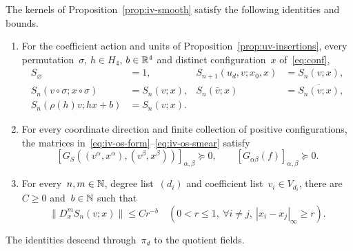 \begin{proposition}\label{prop:iv-euclidean}
The kernels of Proposition~\ref{prop:iv-smooth} satisfy the following identities and bounds.
\begin{enumerate}[label=\textup{(\roman*)},ref=\theproposition(\roman*)]
\item\label{item:iv-symmetries} For the coefficient action and units of Proposition~\ref{prop:uv-insertions}, every permutation~$\sigma$, $h\in H_4$, $b\in\mathbb R^4$ and distinct configuration~$x$ of~\eqref{eq:conf},
\begin{equation}\label{eq:iv-symmetries}
\begin{aligned}
 S_\varnothing&=1,&
 S_{n+1}(u_d,v;x_0,x)&=S_n(v;x),\\
 S_n(v\circ\sigma;x\circ\sigma)&=S_n(v;x),&
 S_n(\bar v;x)&=\overline{S_n(v;x)},\\
 S_n(\rho(h)v;hx+b)&=S_n(v;x).
\end{aligned}
\end{equation}
\item\label{item:iv-reflection} For every coordinate direction and finite collection of positive configurations, the matrices in~\eqref{eq:iv-os-form}--\eqref{eq:iv-os-smear} satisfy
\begin{equation}\label{eq:iv-os-positive}
 [G_S((v^\alpha,x^\alpha),(v^\beta,x^\beta))]_{\alpha,\beta}\succeq0,
 \qquad [G_{\alpha\beta}(f)]_{\alpha,\beta}\succeq0.
\end{equation}
\item\label{item:iv-power} For every~$n,m\in\mathbb N$, degree list~$(d_i)$ and coefficient list~$v_i\in V_{d_i}$, there are~$C\ge0$ and~$b\in\mathbb N$ such that
\begin{equation}\label{eq:iv-derivative-bound}
 \|D_x^m S_n(v;x)\|\le Cr^{-b}
 \quad\left(0<r\le1,\ \forall i\ne j,\ |x_i-x_j|_\infty\ge r\right).
\end{equation}
\end{enumerate}
The identities descend through~$\pi_d$ to the quotient fields.
\end{proposition}

